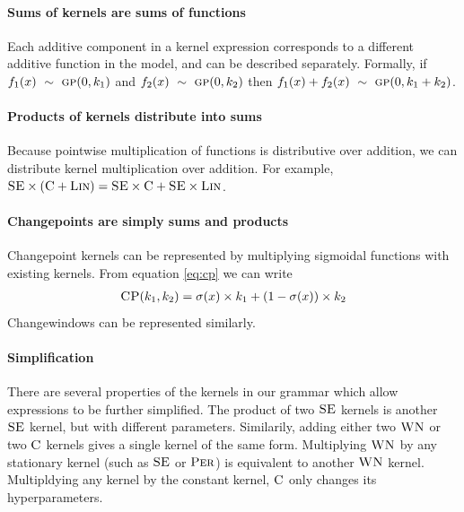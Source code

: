 \documentclass{article}
\def\ie{i.e.\ }
\begin{document}
\paragraph{Sums of kernels are sums of functions}

Each additive component in a kernel expression corresponds to a different additive function in the model, and can be described separately.  Formally, if $f_1(x) \ \sim\  {\textsc{gp}}{}(0, k_1)$ and $f_2(x) \ \sim\  {\textsc{gp}}{}(0, k_2)$ then $f_1(x) + f_2(x) \ \sim\  {\textsc{gp}}{}(0, k_1 + k_2)$.


\paragraph{Products of kernels distribute into sums}

Because pointwise multiplication of functions is distributive over addition, we can distribute kernel multiplication over addition.  For example, ${\textsc{SE}} \times ({\textsc{C}} + {\textsc{Lin}}) = {\textsc{SE}} \times {\textsc{C}} + {\textsc{SE}} \times {\textsc{Lin}}$.

\paragraph{Changepoints are simply sums and products}
Changepoint kernels can be represented by multiplying sigmoidal functions with existing kernels.
From equation \eqref{eq:cp} we can write
\begin{align}
{\textsc{CP}}(k_1, k_2) = \sigma(x)\times k_1 + (1-\sigma(x)) \times k_2
\end{align}
Changewindows can be represented similarly.

\paragraph{Simplification}

There are several properties of the kernels in our grammar which allow expressions to be further simplified.  
%
The product of two ${\textsc{SE}}$ kernels is another ${\textsc{SE}}$ kernel, but with different parameters.
Similarily, adding either two ${\textsc{WN}}$ or two ${\textsc{C}}$ kernels gives a single kernel of the same form.
%
Multiplying ${\textsc{WN}}$ by any stationary kernel (such as ${\textsc{SE}}$ or ${\textsc{Per}}$) is equivalent to another ${\textsc{WN}}$ kernel.
Multipldying any kernel by the constant kernel, ${\textsc{C}}$ only changes its hyperparameters.

\end{document}

